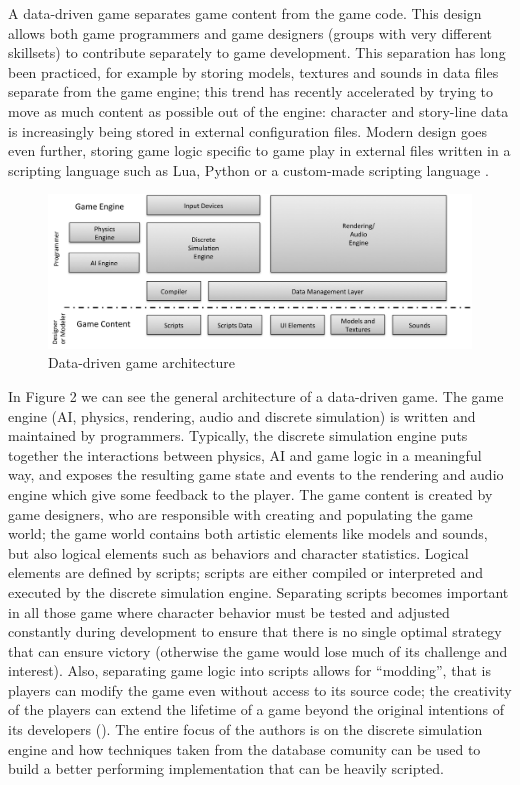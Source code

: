 %
%

A data-driven game \cite{10} separates game content from the game code. This design allows both game programmers and game designers (groups with very different skillsets) to contribute separately to game development. This separation has long been practiced, for example by storing models, textures and sounds in data files separate from the game engine; this trend has recently accelerated by trying to move as much content as possible out of the engine: character and story-line data is increasingly \cite{25} being stored in external configuration files. Modern design goes even further, storing game logic specific to game play in external files written in a scripting language such as Lua, Python or a custom-made scripting language \cite{SCRIPTING_LUA,SCRIPTING_PYTHON,UNREALSCRIPT_LATENT_FUNCTIONS}.

\begin{figure}
\begin{center}
\includegraphics[scale=0.5]{engine_architecture.png}
\end{center}
\label{fig:data_driven_games}
\caption{Data-driven game architecture}
\end{figure}

In Figure 2 we can see the general architecture of a data-driven game. The game engine (AI, physics, rendering, audio and discrete simulation) is written and maintained by programmers. Typically, the discrete simulation engine puts together the interactions between physics, AI and game logic in a meaningful way, and exposes the resulting game state and events to the rendering and audio engine which give some feedback to the player. The game content is created by game designers, who are responsible with creating and populating the game world; the game world contains both artistic elements like models and sounds, but also logical elements such as behaviors and character statistics. Logical elements are defined by scripts; scripts are either compiled or interpreted and executed by the discrete simulation engine. Separating scripts becomes important in all those game where character behavior must be tested and adjusted constantly during development to ensure that there is no single optimal strategy that can ensure victory (otherwise the game would lose much of its challenge and interest). Also, separating game logic into scripts allows for ``modding'', that is players can modify the game even without access to its source code; the creativity of the players can extend the lifetime of a game beyond the original intentions of its developers (\cite{21}). The entire focus of the authors is on the discrete simulation engine and how techniques taken from the database comunity can be used to build a better performing implementation that can be heavily scripted.

